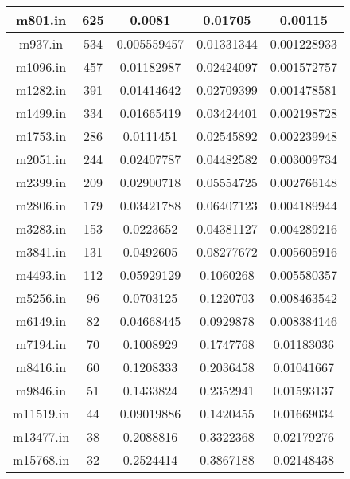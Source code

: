 \documentclass[10pt,a4paper]{article}
\begin{document}
\begin{center}
\begin{tabular}{|c|c|c|c|c|}
			m801.in & 625 &    0.0081          &    0.01705         &    0.00115\\
			\hline 
			m937.in &  534  &    0.005559457     &    0.01331344      &    0.001228933\\
			\hline 
			m1096.in & 457  &    0.01182987      &    0.02424097      &    0.001572757\\
			\hline 
			m1282.in &  391 &    0.01414642      &    0.02709399      &    0.001478581\\
			\hline 
			m1499.in &  334 &    0.01665419      &    0.03424401      &    0.002198728\\
			\hline 
			m1753.in &  286 &    0.0111451       &    0.02545892      &    0.002239948\\
			\hline 
			m2051.in &  244  &    0.02407787      &    0.04482582      &    0.003009734\\
			\hline 
			m2399.in &  209  &    0.02900718      &    0.05554725      &    0.002766148\\
			\hline 
			m2806.in &  179  &    0.03421788      &    0.06407123      &    0.004189944\\
			\hline 
			m3283.in &  153  &    0.0223652       &    0.04381127      &    0.004289216\\
			\hline 
			m3841.in &  131 &    0.0492605       &    0.08277672      &    0.005605916\\
			\hline 
			m4493.in &  112  &    0.05929129      &    0.1060268       &    0.005580357\\
			\hline 
			m5256.in &  96 &    0.0703125       &    0.1220703       &    0.008463542\\
			\hline 
			m6149.in &  82  &    0.04668445      &    0.0929878       &    0.008384146\\
			\hline 
			m7194.in & 70  &    0.1008929       &    0.1747768       &    0.01183036\\
			\hline 
			m8416.in & 60  &    0.1208333       &    0.2036458       &    0.01041667\\
			\hline 
			m9846.in & 51  &    0.1433824       &    0.2352941       &    0.01593137\\
			\hline 
			m11519.in &  44  &    0.09019886      &    0.1420455       &    0.01669034\\
			\hline 
			m13477.in &  38  &    0.2088816       &    0.3322368       &    0.02179276\\
			\hline 
			m15768.in & 32  &    0.2524414       &    0.3867188       &    0.02148438\\

\end{tabular}
\end{center}
\end{document}
